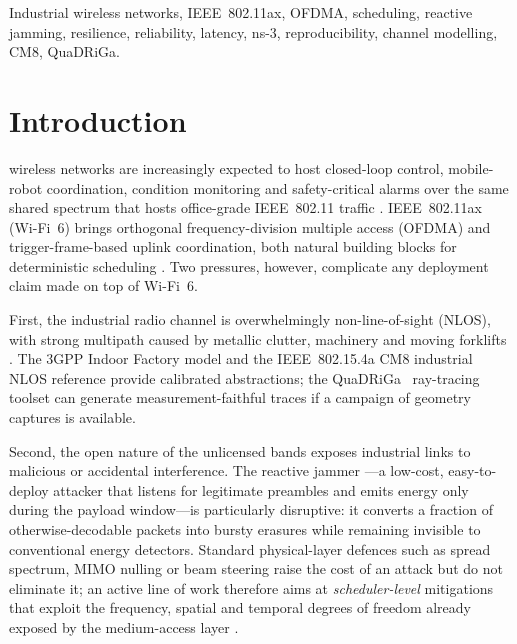 \documentclass[journal,onecolumn,11pt,a4paper]{IEEEtran}
\begin{document}
\begin{IEEEkeywords}
Industrial wireless networks, IEEE~802.11ax, OFDMA, scheduling,
reactive jamming, resilience, reliability, latency, ns-3,
reproducibility, channel modelling, CM8, QuaDRiGa.
\end{IEEEkeywords}

\section{Introduction}
\label{sec:intro}
 wireless networks are increasingly expected
to host closed-loop control, mobile-robot coordination, condition
monitoring and safety-critical alarms over the same shared spectrum
that hosts office-grade IEEE~802.11 traffic
\cite{Aij20,Ang22,TS22104}. IEEE~802.11ax (Wi-Fi~6) brings orthogonal
frequency-division multiple access (OFDMA) and trigger-frame-based
uplink coordination, both natural building blocks for deterministic
scheduling \cite{Kho19,Lop19,Den20,Ban18,Bel19,Tut21}. Two pressures,
however, complicate any deployment claim made on top of Wi-Fi~6.

First, the industrial radio channel is overwhelmingly non-line-of-sight
(NLOS), with strong multipath caused by metallic clutter, machinery and
moving forklifts \cite{Mol09,Mol04,Tan08,Tra18,Jae14}. The
3GPP Indoor Factory model \cite{TR38901} and the
IEEE~802.15.4a CM8 industrial NLOS reference \cite{Mol09} provide
calibrated abstractions; the QuaDRiGa~\cite{Jae14} ray-tracing toolset
can generate measurement-faithful traces if a campaign of geometry
captures is available.

Second, the open nature of the unlicensed bands exposes industrial
links to malicious or accidental interference. The reactive jammer
\cite{Bay08,Bay13,Pel11,Gri21}---a low-cost, easy-to-deploy attacker
that listens for legitimate preambles and emits energy only during the
payload window---is particularly disruptive: it converts a fraction of
otherwise-decodable packets into bursty erasures while remaining
invisible to conventional energy detectors. Standard physical-layer
defences such as spread spectrum, MIMO nulling or beam steering raise
the cost of an attack but do not eliminate it; an active line of work
therefore aims at \emph{scheduler-level} mitigations that exploit the
frequency, spatial and temporal degrees of freedom already exposed by
the medium-access layer \cite{Aij20,Ang22}.
\end{document}

